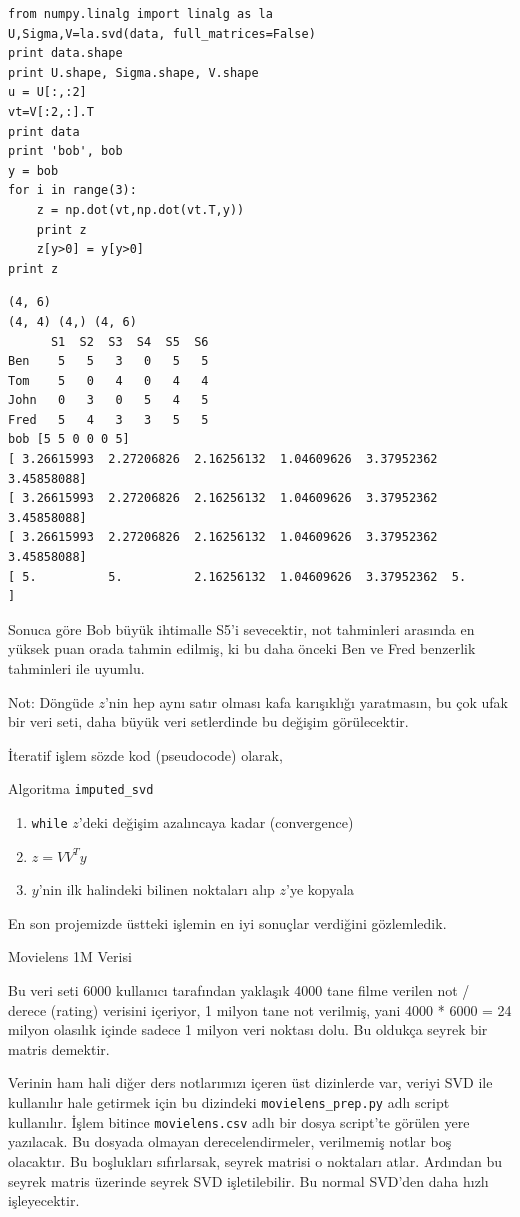 \documentclass[12pt,fleqn]{article}\usepackage{../../common}
\begin{document}
\begin{verbatim}
from numpy.linalg import linalg as la
U,Sigma,V=la.svd(data, full_matrices=False)
print data.shape
print U.shape, Sigma.shape, V.shape
u = U[:,:2]
vt=V[:2,:].T
print data
print 'bob', bob
y = bob
for i in range(3):
    z = np.dot(vt,np.dot(vt.T,y))
    print z
    z[y>0] = y[y>0]
print z
\end{verbatim}

\begin{verbatim}
(4, 6)
(4, 4) (4,) (4, 6)
      S1  S2  S3  S4  S5  S6
Ben    5   5   3   0   5   5
Tom    5   0   4   0   4   4
John   0   3   0   5   4   5
Fred   5   4   3   3   5   5
bob [5 5 0 0 0 5]
[ 3.26615993  2.27206826  2.16256132  1.04609626  3.37952362  3.45858088]
[ 3.26615993  2.27206826  2.16256132  1.04609626  3.37952362  3.45858088]
[ 3.26615993  2.27206826  2.16256132  1.04609626  3.37952362  3.45858088]
[ 5.          5.          2.16256132  1.04609626  3.37952362  5.        ]
\end{verbatim}

Sonuca göre Bob büyük ihtimalle S5'i sevecektir, not tahminleri arasında en
yüksek puan orada tahmin edilmiş, ki bu daha önceki Ben ve Fred benzerlik
tahminleri ile uyumlu. 

Not: Döngüde $z$'nin hep aynı satır olması kafa karışıklığı yaratmasın, bu
çok ufak bir veri seti, daha büyük veri setlerdinde bu değişim
görülecektir. 

İteratif işlem sözde kod (pseudocode) olarak,

Algoritma \verb!imputed_svd!
\begin{enumerate}
  \item \verb!while! $z$'deki değişim azalıncaya kadar (convergence)
  \item $z = VV^Ty$ 
  \item  $y$'nin ilk halindeki bilinen noktaları alıp $z$'ye kopyala
\end{enumerate}

En son projemizde üstteki işlemin en iyi sonuçlar verdiğini gözlemledik. 

Movielens 1M Verisi

Bu veri seti 6000 kullanıcı tarafından yaklaşık 4000 tane filme
verilen not / derece (rating) verisini içeriyor, 1 milyon tane not
verilmiş, yani 4000 * 6000 = 24 milyon olasılık içinde sadece 1 milyon
veri noktası dolu. Bu oldukça seyrek bir matris demektir.

Verinin ham hali diğer ders notlarımızı içeren üst dizinlerde var, veriyi
SVD ile kullanılır hale getirmek için bu dizindeki \verb!movielens_prep.py!
adlı script kullanılır. İşlem bitince \verb!movielens.csv! adlı bir dosya
script'te görülen yere yazılacak. Bu dosyada olmayan derecelendirmeler,
verilmemiş notlar boş olacaktır. Bu boşlukları sıfırlarsak, seyrek matrisi
o noktaları atlar. Ardından bu seyrek matris üzerinde seyrek SVD
işletilebilir. Bu normal SVD'den daha hızlı işleyecektir.
\end{document}
